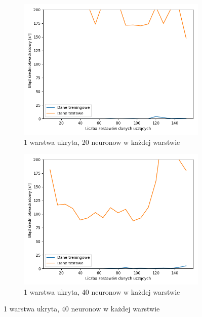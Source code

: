 \documentclass[12pt]{aghdpl}
\begin{document}
		\begin{figure}[h]
			\begin{subfigure}{.5\linewidth}
		 		\includegraphics[width =\linewidth]{wykresy/5_usrednianie_danych/1_warstwa_20_neuronow_learning_curves.png}
		 		\caption{1 warstwa ukryta, 20 neuronow w każdej warstwie}
		 	\end{subfigure}
		 	\begin{subfigure}{.5\linewidth}
		 		\includegraphics[width =\linewidth]{wykresy/5_usrednianie_danych/1_warstwa_40_neuronow_learning_curves.png}
		 		\caption{1 warstwa ukryta, 40 neuronow w każdej warstwie}
		 	\end{subfigure}
		 	

\end{figure}
\end{document}
